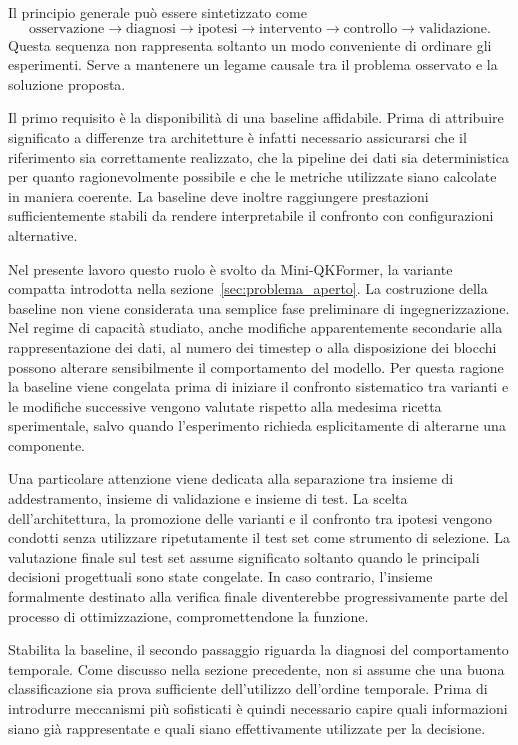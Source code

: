 Il principio generale può essere sintetizzato come
\begin{equation}
\label{eq:metodologia_sequenza}
\text{osservazione} \rightarrow \text{diagnosi} \rightarrow \text{ipotesi} \rightarrow \text{intervento} \rightarrow \text{controllo} \rightarrow \text{validazione}.
\end{equation}
Questa sequenza non rappresenta soltanto un modo conveniente di ordinare gli esperimenti. Serve a mantenere un legame causale tra il problema osservato e la soluzione proposta.

Il primo requisito è la disponibilità di una baseline affidabile. Prima di attribuire significato a differenze tra architetture è infatti necessario assicurarsi che il riferimento sia correttamente realizzato, che la pipeline dei dati sia deterministica per quanto ragionevolmente possibile e che le metriche utilizzate siano calcolate in maniera coerente. La baseline deve inoltre raggiungere prestazioni sufficientemente stabili da rendere interpretabile il confronto con configurazioni alternative.

Nel presente lavoro questo ruolo è svolto da Mini-QKFormer, la variante compatta introdotta nella sezione~\ref{sec:problema_aperto}. La costruzione della baseline non viene considerata una semplice fase preliminare di ingegnerizzazione. Nel regime di capacità studiato, anche modifiche apparentemente secondarie alla rappresentazione dei dati, al numero dei timestep o alla disposizione dei blocchi possono alterare sensibilmente il comportamento del modello. Per questa ragione la baseline viene congelata prima di iniziare il confronto sistematico tra varianti e le modifiche successive vengono valutate rispetto alla medesima ricetta sperimentale, salvo quando l'esperimento richieda esplicitamente di alterarne una componente.

Una particolare attenzione viene dedicata alla separazione tra insieme di addestramento, insieme di validazione e insieme di test. La scelta dell'architettura, la promozione delle varianti e il confronto tra ipotesi vengono condotti senza utilizzare ripetutamente il test set come strumento di selezione. La valutazione finale sul test set assume significato soltanto quando le principali decisioni progettuali sono state congelate. In caso contrario, l'insieme formalmente destinato alla verifica finale diventerebbe progressivamente parte del processo di ottimizzazione, compromettendone la funzione.

Stabilita la baseline, il secondo passaggio riguarda la diagnosi del comportamento temporale. Come discusso nella sezione precedente, non si assume che una buona classificazione sia prova sufficiente dell'utilizzo dell'ordine temporale. Prima di introdurre meccanismi più sofisticati è quindi necessario capire quali informazioni siano già rappresentate e quali siano effettivamente utilizzate per la decisione.

